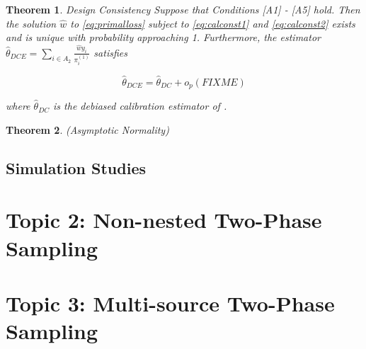\documentclass[12pt]{article}
\newtheorem{theorem}{Theorem}
\begin{document}
\begin{theorem}{Design Consistency}
  Suppose that Conditions [A1] - [A5] hold. Then the solution $\hat w$ to 
  \ref{eq:primalloss} subject to \ref{eq:calconst1} and \ref{eq:calconst2} 
  exists and is unique with probability approaching 1. Furthermore, the
  estimator $\hat \theta_{DCE} = \sum_{i \in A_2} \frac{\hat w y_i}{\pi_i^{(1)}}$
  satisfies

  $$\hat \theta_{DCE} = \hat \theta_{DC} + o_p(FIXME)$$

  where $\hat \theta_{DC}$ is the debiased calibration estimator of 
  \cite{kwon2024debiased}.

\end{theorem}

\begin{theorem}(Asymptotic Normality)

\end{theorem}


\subsection*{Simulation Studies}


\section*{Topic 2: Non-nested Two-Phase Sampling}

\section*{Topic 3: Multi-source Two-Phase Sampling}

\printbibliography
\end{document}
